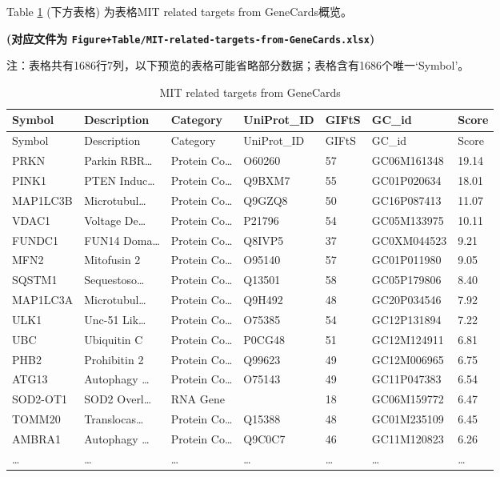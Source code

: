 \documentclass[
]{article}
\begin{document}
Table \ref{tab:MIT-related-targets-from-GeneCards} (下方表格) 为表格MIT related targets from GeneCards概览。

\textbf{(对应文件为 \texttt{Figure+Table/MIT-related-targets-from-GeneCards.xlsx})}

\begin{center}\begin{tcolorbox}[colback=gray!10, colframe=gray!50, width=0.9\linewidth, arc=1mm, boxrule=0.5pt]注：表格共有1686行7列，以下预览的表格可能省略部分数据；表格含有1686个唯一`Symbol'。
\end{tcolorbox}
\end{center}

\begin{longtable}[]{@{}lllllll@{}}
\caption{\label{tab:MIT-related-targets-from-GeneCards}MIT related targets from GeneCards}\tabularnewline
\toprule
Symbol & Description & Category & UniProt\_ID & GIFtS & GC\_id & Score\tabularnewline
\midrule
\endfirsthead
\toprule
Symbol & Description & Category & UniProt\_ID & GIFtS & GC\_id & Score\tabularnewline
\midrule
\endhead
PRKN & Parkin RBR\ldots{} & Protein Co\ldots{} & O60260 & 57 & GC06M161348 & 19.14\tabularnewline
PINK1 & PTEN Induc\ldots{} & Protein Co\ldots{} & Q9BXM7 & 55 & GC01P020634 & 18.01\tabularnewline
MAP1LC3B & Microtubul\ldots{} & Protein Co\ldots{} & Q9GZQ8 & 50 & GC16P087413 & 11.07\tabularnewline
VDAC1 & Voltage De\ldots{} & Protein Co\ldots{} & P21796 & 54 & GC05M133975 & 10.11\tabularnewline
FUNDC1 & FUN14 Doma\ldots{} & Protein Co\ldots{} & Q8IVP5 & 37 & GC0XM044523 & 9.21\tabularnewline
MFN2 & Mitofusin 2 & Protein Co\ldots{} & O95140 & 57 & GC01P011980 & 9.05\tabularnewline
SQSTM1 & Sequestoso\ldots{} & Protein Co\ldots{} & Q13501 & 58 & GC05P179806 & 8.40\tabularnewline
MAP1LC3A & Microtubul\ldots{} & Protein Co\ldots{} & Q9H492 & 48 & GC20P034546 & 7.92\tabularnewline
ULK1 & Unc-51 Lik\ldots{} & Protein Co\ldots{} & O75385 & 54 & GC12P131894 & 7.22\tabularnewline
UBC & Ubiquitin C & Protein Co\ldots{} & P0CG48 & 51 & GC12M124911 & 6.81\tabularnewline
PHB2 & Prohibitin 2 & Protein Co\ldots{} & Q99623 & 49 & GC12M006965 & 6.75\tabularnewline
ATG13 & Autophagy \ldots{} & Protein Co\ldots{} & O75143 & 49 & GC11P047383 & 6.54\tabularnewline
SOD2-OT1 & SOD2 Overl\ldots{} & RNA Gene & & 18 & GC06M159772 & 6.47\tabularnewline
TOMM20 & Translocas\ldots{} & Protein Co\ldots{} & Q15388 & 48 & GC01M235109 & 6.45\tabularnewline
AMBRA1 & Autophagy \ldots{} & Protein Co\ldots{} & Q9C0C7 & 46 & GC11M120823 & 6.26\tabularnewline
\ldots{} & \ldots{} & \ldots{} & \ldots{} & \ldots{} & \ldots{} & \ldots{}\tabularnewline
\bottomrule
\end{longtable}
\end{document}
